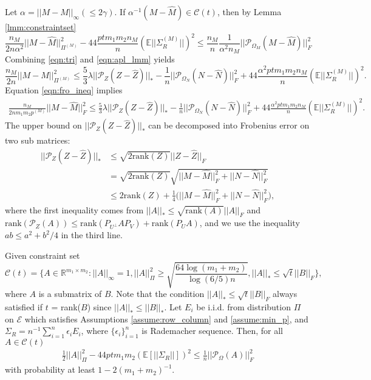 \documentclass{article} %
\newcommand\mc{\mathcal} %
\begin{document}
Let $\alpha = ||M - \hat{M}||_\infty (\leq 2\gamma)$. If $\alpha^{-1}(M-\hat{M}) \in \mc{C}(t)$, then by Lemma \ref{lmm:constraintset}
\begin{equation}
\frac{n_M}{2n\alpha^2}||M-\hat{M}||_{\Pi^{(M)}}^2  - 44 \frac{ptm_1m_2n_M}{n}(\mathbb{E}||\Sigma_R^{(M)}||)^2 
\leq \frac{n_M}{n}\frac{1}{\alpha^2n_M}||\mc{P}_{\Omega_M}(M-\hat{M})||_F^2 \label{eqn:apl_lmm}
\end{equation}
Combining \ref{eqn:tri} and \ref{eqn:apl_lmm} yields
\begin{equation}
\frac{n_M}{2n}||M-\hat{M}||_{\Pi^{(M)}}^2  \leq \frac{5}{3}\lambda ||\mc{P}_Z(Z-\hat{Z})||_* - \frac{1}{n}||\mc{P}_{\Omega_N}(N-\hat{N})||_F^2 + 44 \frac{\alpha^2 ptm_1m_2n_M}{n}(\mathbb{E}||\Sigma_R^{(M)}||)^2.
\end{equation}
Equation \ref{eqn:fro_ineq} implies
\begin{align}
\frac{n_M}{2nm_1m_2p^{(M)}}||M-\hat{M}||_F^2  \leq \frac{5}{3}\lambda ||\mc{P}_Z(Z-\hat{Z})||_* - \frac{1}{n}||\mc{P}_{\Omega_N}(N-\hat{N})||_F^2 + 44 \frac{\alpha^2 ptm_1m_2n_M}{n}(\mathbb{E}||\Sigma_R^{(M)}||)^2.
\end{align}
The upper bound on $||\mc{P}_Z(Z-\hat{Z})||_*$ can be decomposed into Frobenius error on two sub matrices:
\begin{align}
||\mc{P}_Z(Z-\hat{Z})||_* & \leq \sqrt{2\text{rank}(Z)}||Z-\hat{Z}||_F \\
& =  \sqrt{2\text{rank}(Z)} \sqrt{||M-\hat{M}||_F^2 + ||N-\hat{N}||_F^2}\\
& \leq 2\text{rank}(Z) + \frac{1}{4}\bigg(||M-\hat{M}||_F^2 + ||N-\hat{N}||_F^2\bigg),
\end{align}
where the first inequality comes from $||A||_* \leq \sqrt{\text{rank}(A)}||A||_F$ and $\text{rank}(\mc{P}_Z(A)) \leq \text{rank}(P_{U^\perp}AP_V) + \text{rank}(P_{U}A)$, and we use the inequality $ab \leq a^2 + b^2/4$ in the third line.


\begin{lemma} \label{lmm:constraintset} Given constraint set
\begin{equation}
\mc{C}(t) = \bigg\{ A \in \mathbb{R}^{m_1 \times m_2}: ||A||_\infty = 1, ||A||_\Pi^2 \geq \sqrt{\frac{64\log(m_1+m_2)}{\log(6/5)n}}, ||A||_* \leq \sqrt{t}||B||_F \bigg\},
\end{equation}
where $A$ is a submatrix of $B$. Note that the condition $||A||_* \leq \sqrt{t}||B||_F$ always satisfied if $t$ = rank($B$) since $||A||_* \leq ||B||_*$. Let $E_i$ be i.i.d. from distribution $\Pi$ on $\mc{E}$ which satisfies Assumptions \ref{assume:row_column} and \ref{assume:min_p}, and $\Sigma_R = n^{-1}\sum_{i=1}^{n}\epsilon_i E_i$, where $\{\epsilon_i\}_{i=1}^{n}$ is Rademacher sequence. Then, for all $A\in \mc{C}(t)$
\begin{align}
\frac{1}{2}||A||_\Pi^2  - 44 ptm_1m_2(\mathbb{E}[||\Sigma_R||])^2 \leq \frac{1}{n}||\mc{P}_{\Omega}(A)||_F^2
\end{align}
with probability at least $1-2(m_1+m_2)^{-1}$.
\end{lemma}
\end{document}
